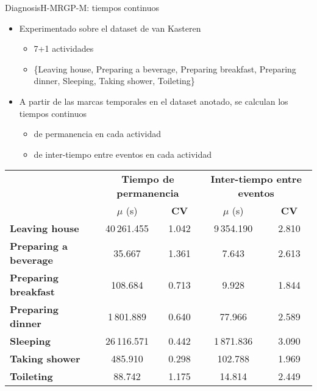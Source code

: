 \documentclass[9pt, handout]{beamer}
\begin{document}
      \begin{frame}{Diagnosis}{H-MRGP-M: tiempos continuos}
        \begin{itemize}
          \item Experimentado sobre el dataset de van Kasteren
          \begin{itemize}
            \item 7+1 actividades
            \item \{Leaving house, Preparing a beverage, Preparing breakfast, Preparing dinner, Sleeping, Taking shower, Toileting\}
          \end{itemize}
          \item A partir de las marcas temporales en el dataset anotado, se calculan los tiempos continuos
          \begin{itemize}
            \item de permanencia en cada actividad
            \item de inter-tiempo entre eventos en cada actividad
          \end{itemize}
        \end{itemize}
        
    		\begin{table}[h!]
    			\centering
    			\small
    			\setlength{\tabcolsep}{5pt}
    			\def\arraystretch{0.75}
    			\begin{tabular}{| l | c | c || c | c |}
    				\hline
    				& \multicolumn{2}{|c||}{\bf Tiempo de permanencia}& \multicolumn{2}{|c|}{\bf Inter-tiempo entre eventos}\\
    				\cline{2-5}
    				& $\mu$ (s) & {\bf CV} & $\mu$ (s) & {\bf CV}\\
    				\hline
    				{\bf Leaving house} & 40\,261.455 & 1.042 & 9\,354.190 & 2.810 \\ \hline
    				{\bf Preparing a beverage} &  35.667 & 1.361 & 7.643 & 2.613\\ \hline
    				{\bf Preparing breakfast} &  108.684 & 0.713 & 9.928 & 1.844\\ \hline
    				{\bf Preparing dinner} &  1\,801.889 & 0.640 & 77.966 & 2.589\\ \hline
    				{\bf Sleeping} &  26\,116.571 & 0.442 & 1\,871.836 & 3.090\\ \hline
    				{\bf Taking shower} &  485.910 & 0.298 & 102.788 & 1.969\\ \hline
    				{\bf Toileting} &  88.742 & 1.175 & 14.814 & 2.449\\ 
    				\hline
      		\end{tabular}
    		\end{table}
      \end{frame}
      
\end{document}
